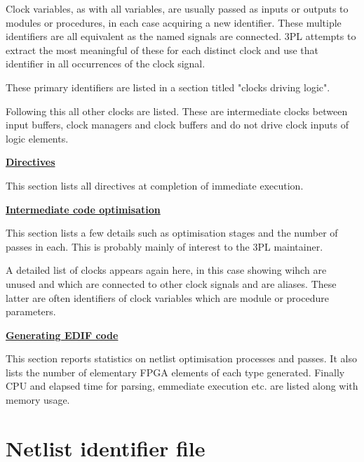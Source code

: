             Clock variables, as with all
            variables, are usually passed as inputs or outputs to modules or
            procedures, in each case acquiring a new identifier. These multiple
            identifiers are all equivalent as the named signals are connected.
            3PL attempts to extract the most meaningful of these for each
            distinct clock and use that identifier in all occurrences of the
            clock signal.
            
            These primary identifiers are listed in a section titled "clocks
            driving logic".
            
            Following this all other clocks are listed. These are intermediate
            clocks between input buffers, clock managers and clock buffers and do
            not drive clock inputs of logic elements.
            
        {\bf \underline{Directives}}
        
            This section lists all directives at completion of immediate
            execution.
            
        {\bf \underline{Intermediate code optimisation}}
        
            This section lists a few details such as optimisation stages
            and the number of passes in each. This is probably mainly of
            interest to the 3PL maintainer.
            
            A detailed list of clocks appears again here, in this case showing
            wihch are unused and which are connected to other clock signals
            and are aliases. These latter are often identifiers of clock
            variables which are module or procedure parameters.
            
        {\bf \underline{Generating EDIF code}}
        
            This section reports statistics on netlist optimisation processes
            and passes. It also lists the number of elementary FPGA elements
            of each type generated. Finally CPU and elapsed time for
            parsing, emmediate execution etc. are listed along with memory
            usage.
        
        
        
        
        

    \section{Netlist identifier file}

